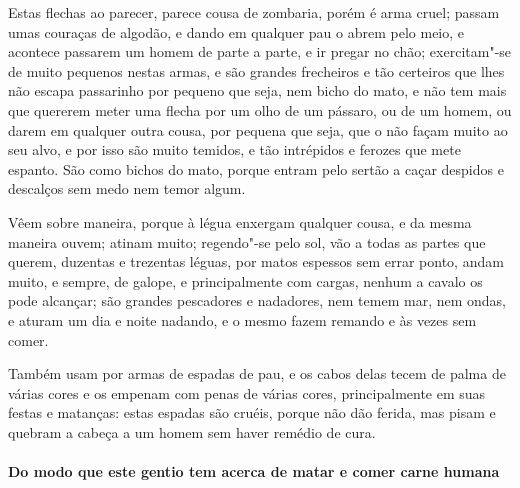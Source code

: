  Estas flechas ao parecer, parece cousa de zombaria, porém é arma cruel;
passam umas couraças de algodão, e dando em qualquer pau o abrem pelo
meio, e acontece passarem um homem de parte a parte, e ir pregar no
chão; exercitam"-se de muito pequenos nestas armas, e são grandes
frecheiros e tão certeiros que lhes não escapa passarinho por pequeno
que seja, nem bicho do mato, e não tem mais que quererem meter uma
flecha por um olho de um pássaro, ou de um homem, ou darem em qualquer
outra cousa, por pequena que seja, que o não façam muito ao seu alvo, e
por isso são muito temidos, e tão intrépidos e ferozes que mete
espanto. São como bichos do mato, porque entram pelo sertão a caçar
despidos e descalços sem medo nem temor algum.

 Vêem sobre maneira, porque à légua enxergam qualquer cousa, e da mesma
maneira ouvem; atinam muito; regendo"-se pelo sol, vão a todas as partes
que querem, duzentas e trezentas léguas, por matos espessos sem errar
ponto, andam muito, e sempre, de galope, e principalmente com cargas,
nenhum a cavalo os pode alcançar; são grandes pescadores e nadadores,
nem temem mar, nem ondas, e aturam um dia e noite nadando, e o mesmo
fazem remando e às vezes sem comer.

 Também usam por armas de espadas de pau, e os cabos delas tecem de
palma de várias cores e os empenam com penas de várias cores,
principalmente em suas festas e matanças: estas espadas são cruéis,
porque não dão ferida, mas pisam e quebram a cabeça a um homem sem
haver remédio de cura.

\paragraph{Do modo que este gentio tem acerca de matar e comer carne humana}

